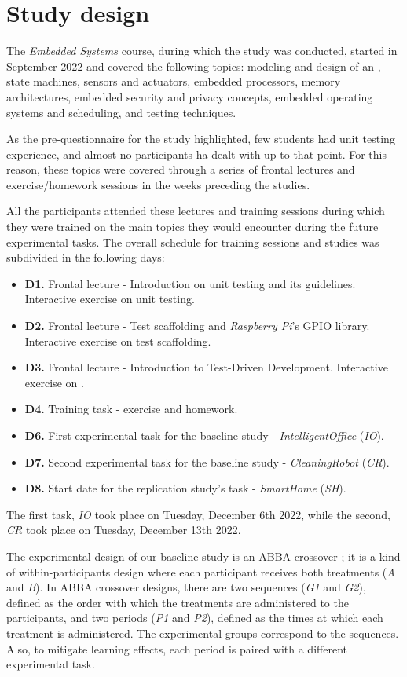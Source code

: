 \section{Study design}
The \textit{Embedded Systems} course, during which the study was conducted, started in September 2022 and covered the following topics: modeling and design of an \es, state machines, sensors and actuators, embedded processors, memory architectures, embedded security and privacy concepts, embedded operating systems and scheduling, and \es testing techniques.

As the pre-questionnaire for the study highlighted, few students had unit testing experience, and almost no participants ha dealt with \tdd up to that point. For this reason, these topics were covered through a series of frontal lectures and exercise/homework sessions in the weeks preceding the studies.

All the participants attended these lectures and training sessions during which they were trained on the main topics they would encounter during the future experimental tasks. The overall schedule for training sessions and studies was subdivided in the following days:
\begin{itemize}
    \item \textbf{D1.} Frontal lecture - Introduction on unit testing and its guidelines. Interactive exercise on unit testing.
    \item \textbf{D2.} Frontal lecture - Test scaffolding and \textit{Raspberry Pi}'s GPIO library. Interactive exercise on test scaffolding.
    \item \textbf{D3.} Frontal lecture - Introduction to Test-Driven Development. Interactive exercise on \tdd.
    \item \textbf{D4.} Training task - \tdd exercise and homework.
    \item \textbf{D6.} First experimental task for the baseline study - \textit{IntelligentOffice} (\textit{IO}).
    \item \textbf{D7.} Second experimental task for the baseline study - \textit{CleaningRobot} (\textit{CR}).
    \item \textbf{D8.} Start date for the replication study's task - \textit{SmartHome} (\textit{SH}).
\end{itemize}


The first task, \textit{IO} took place on Tuesday, December 6th 2022, while the second, \textit{CR} took place on Tuesday, December 13th 2022. 


The experimental design of our baseline study is an ABBA crossover \cite{DBLP:journals/tse/VegasAJ16}; it is a kind of within-participants design where each participant receives both treatments (\ie \textit{A} and \textit{B}). In ABBA crossover designs, there are two sequences (\ie \textit{G1} and \textit{G2}), defined as the order with which the treatments are administered to the participants, and two periods (\ie \textit{P1} and \textit{P2}), defined as the times at which each treatment is administered. The experimental groups correspond to the sequences. Also, to mitigate learning effects, each period is paired with a
different experimental task.

